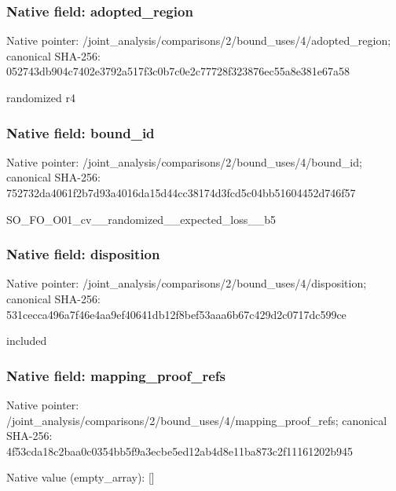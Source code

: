 \documentclass[10pt,a4paper]{article}
\begin{document}
\subsubsection{Native field: adopted\_\allowbreak{}region}
Native pointer: /joint\_\allowbreak{}analysis/comparisons/2/bound\_\allowbreak{}uses/4/adopted\_\allowbreak{}region; canonical SHA-256: 052743db904c7402e3792a517f3c0b7c0e2c77728f323876ec55a8e381e67a58

\begingroup\raggedright\sloppy randomized r4\par\endgroup

\subsubsection{Native field: bound\_\allowbreak{}id}
Native pointer: /joint\_\allowbreak{}analysis/comparisons/2/bound\_\allowbreak{}uses/4/bound\_\allowbreak{}id; canonical SHA-256: 752732da4061f2b7d93a4016da15d44cc38174d3fcd5c04bb51604452d746f57

\begingroup\raggedright\sloppy SO\_\allowbreak{}FO\_\allowbreak{}O01\_\allowbreak{}cv\_\allowbreak{}\_\allowbreak{}randomized\_\allowbreak{}\_\allowbreak{}expected\_\allowbreak{}loss\_\allowbreak{}\_\allowbreak{}b5\par\endgroup

\subsubsection{Native field: disposition}
Native pointer: /joint\_\allowbreak{}analysis/comparisons/2/bound\_\allowbreak{}uses/4/disposition; canonical SHA-256: 531cecca496a7f46e4aa9ef40641db12f8bef53aaa6b67c429d2c0717dc599ce

\begingroup\raggedright\sloppy included\par\endgroup

\subsubsection{Native field: mapping\_\allowbreak{}proof\_\allowbreak{}refs}
Native pointer: /joint\_\allowbreak{}analysis/comparisons/2/bound\_\allowbreak{}uses/4/mapping\_\allowbreak{}proof\_\allowbreak{}refs; canonical SHA-256: 4f53cda18c2baa0c0354bb5f9a3ecbe5ed12ab4d8e11ba873c2f11161202b945

Native value (empty\_\allowbreak{}array): []
\end{document}
